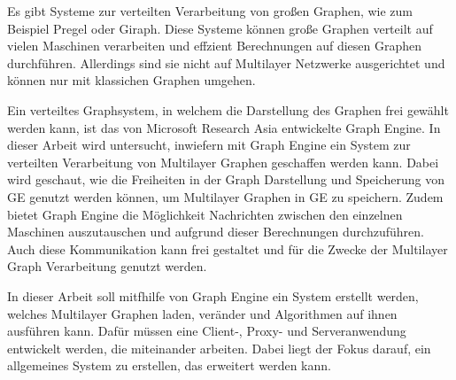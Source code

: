 Es gibt Systeme zur verteilten Verarbeitung von großen Graphen, wie zum Beispiel Pregel oder Giraph. Diese Systeme können große Graphen verteilt auf vielen Maschinen verarbeiten und effzient Berechnungen auf diesen Graphen durchführen. Allerdings sind sie nicht auf Multilayer Netzwerke ausgerichtet und können nur mit klassichen Graphen umgehen.


Ein verteiltes Graphsystem, in welchem die Darstellung des Graphen frei gewählt werden kann, ist das von Microsoft Research Asia entwickelte Graph Engine.
In dieser Arbeit wird untersucht, inwiefern mit Graph Engine ein System zur verteilten Verarbeitung von Multilayer Graphen geschaffen werden kann. Dabei wird geschaut, wie die Freiheiten in der Graph Darstellung und Speicherung von GE genutzt werden können,
um Multilayer Graphen in GE zu speichern. Zudem bietet Graph Engine die Möglichkeit Nachrichten zwischen den einzelnen Maschinen auszutauschen und aufgrund dieser Berechnungen durchzuführen. Auch diese Kommunikation kann frei gestaltet und für die Zwecke der Multilayer Graph Verarbeitung genutzt werden.


In dieser Arbeit soll mitfhilfe von Graph Engine ein System erstellt werden, welches Multilayer Graphen laden, veränder und Algorithmen auf ihnen ausführen kann. Dafür müssen eine Client-, Proxy- und Serveranwendung entwickelt werden, die miteinander arbeiten.
Dabei liegt der Fokus darauf, ein allgemeines System zu erstellen, das erweitert werden kann. 
